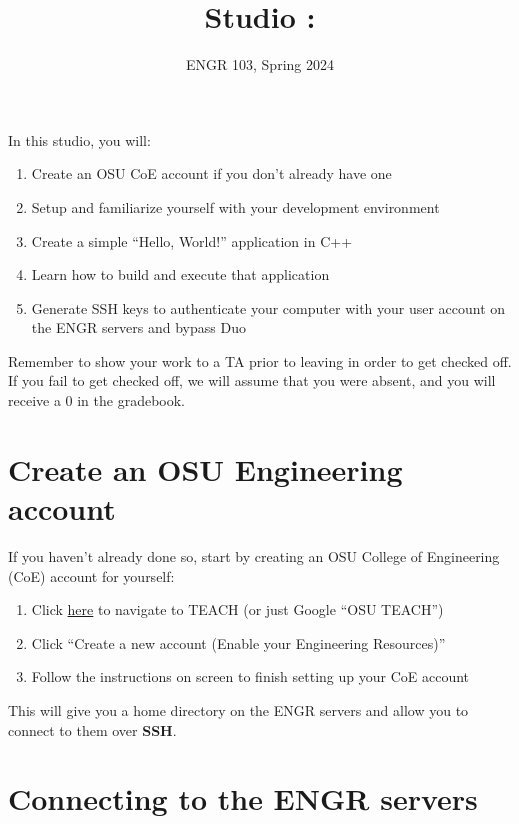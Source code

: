 \documentclass{article}
\title{
    Studio \studionumber: \studiotitle
}
\author{ENGR 103, Spring 2024}
\date{}
\begin{document}
\maketitle

In this studio, you will:

\begin{enumerate}
    \item Create an OSU CoE account if you don't already have one
    \item Setup and familiarize yourself with your development environment
    \item Create a simple ``Hello, World!'' application in C++
    \item Learn how to build and execute that application
    \item Generate SSH keys to authenticate your computer with your user account on the ENGR servers and bypass Duo
\end{enumerate}

Remember to show your work to a TA prior to leaving in order to get checked off. If you fail to get checked off, we will assume that you were absent, and you will receive a 0 in the gradebook.

\section{Create an OSU Engineering account}

If you haven't already done so, start by creating an OSU College of Engineering (CoE) account for yourself:

\begin{enumerate}
    \item Click \href{https://teach.engr.oregonstate.edu/teach.php?type=want_auth}{here} to navigate to TEACH (or just Google ``OSU TEACH'')
    \item Click ``Create a new account (Enable your Engineering Resources)''
    \item Follow the instructions on screen to finish setting up your CoE account
\end{enumerate}

This will give you a home directory on the ENGR servers and allow you to connect to them over \textbf{SSH}.

\section{Connecting to the ENGR servers}
\end{document}
